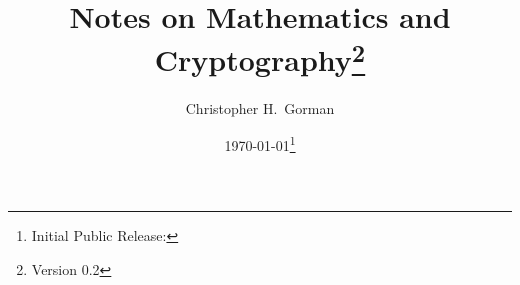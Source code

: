 
\newcommand*{\Author}[0]{Christopher H.~Gorman}
\newcommand*{\Title}[0]{Notes on Mathematics and Cryptography}






\author{\Author{}}
\title{\Title{}\thanks{Version 0.2}}
\date{\today\thanks{Initial Public Release: }}


